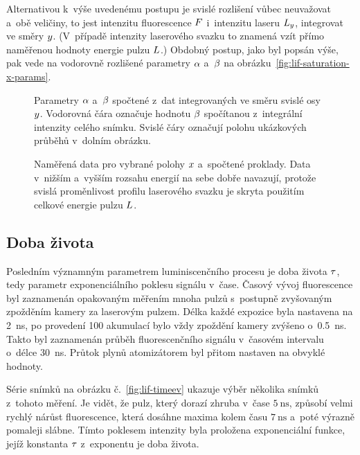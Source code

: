 Alternativou k~výše uvedenému postupu je svislé rozlišení vůbec neuvažovat
a~obě veličiny, to jest intenzitu fluorescence $F$ i~intenzitu
laseru $L_y$, integrovat ve směry $y$.
(V~případě intenzity laserového svazku to znamená vzít přímo
naměřenou hodnoty energie pulzu $L$.)
Obdobný postup, jako byl popsán výše, pak vede na vodorovně rozlišené
parametry $\alpha$ a~$\beta$ na obrázku~\ref{fig:lif-saturation-x-params}.

\begin{figure}[htp]
	\centering
	\small
	
	\caption{Parametry $\alpha$ a~$\beta$ spočtené z~dat integrovaných
		ve směru svislé osy $y$.
		Vodorovná čára označuje hodnotu $\beta$ spočítanou z~integrální
		intenzity celého snímku.
		Svislé čáry označují polohu ukázkových průběhů v~dolním obrázku.}
	\label{fig:lif-saturation-x-params}
	\bigskip
	
	\caption{Naměřená data pro vybrané polohy $x$ a~spočtené proklady.
		Data v~nižším a~vyšším rozsahu energií na sebe dobře navazují,
		protože svislá proměnlivost profilu laserového svazku je skryta
		použitím celkové energie pulzu $L$.}
	\label{fig:lif-saturation-x-fits}
\end{figure}

\subsection{Doba života}
\label{sec:lif-lifetime}
Posledním významným parametrem luminiscenčního procesu
je doba života $\tau$,
tedy parametr exponenciálního poklesu signálu v~čase.
Časový vývoj fluorescence byl zaznamenán opakovaným měřením mnoha pulzů
s~postupně zvyšovaným zpožděním kamery za laserovým pulzem.
Délka každé expozice byla nastavena na \SI{2}{\nano\second},
po provedení 100 akumulací bylo vždy zpoždění kamery zvýšeno
o~\SI{0.5}{\nano\second}.
Takto byl zaznamenán průběh fluorescenčního signálu v~časovém intervalu
o~délce \SI{30}{\nano\second}.
Průtok plynů atomizátorem byl přitom nastaven na obvyklé hodnoty.

Série snímků na obrázku č.~\ref{fig:lif-timeev} ukazuje výběr několika
snímků z~tohoto měření.
Je vidět, že pulz, který dorazí zhruba v~čase $\SI{5}{\nano\second}$,
způsobí velmi rychlý nárůst fluorescence, která dosáhne maxima kolem
času $\SI{7}{\nano\second}$ a~poté výrazně pomaleji slábne.
Tímto poklesem intenzity byla proložena exponenciální funkce,
jejíž konstanta $\tau$ z~exponentu je doba života.

